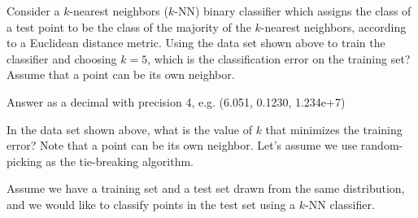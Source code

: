 \documentclass[11pt,addpoints,answers]{exam}
\numberwithin{equation}{section} %
\numberwithin{figure}{section} %
\numberwithin{table}{section} %
\begin{document}
\begin{questions}
    \question[3] Consider a $k$-nearest neighbors ($k$-NN) binary classifier which assigns the class of a test point to be the class of the majority of the $k$-nearest neighbors, according to a Euclidean distance metric. Using the data set shown above to train the classifier and choosing $k=5$, which is the classification error on the training set? Assume that a point can be its own neighbor.
    
    Answer as a decimal with precision 4, e.g. (6.051, 0.1230, 1.234e+7)
    
    \begin{tcolorbox}[fit,height=1cm, width=4cm, blank, borderline={1pt}{-2pt},nobeforeafter, top=2pt, left=2pt, right=2pt, bottom=2pt]
    \end{tcolorbox}
 
    
    
    \question[3] In the data set shown above, what is the value of $k$ that minimizes the training error? Note that a point can be its own neighbor. Let’s assume we use random-picking as the tie-breaking algorithm.
    
    \begin{tcolorbox}[fit,height=1cm, width=4cm, blank, borderline={1pt}{-2pt},nobeforeafter, top=2pt, left=2pt, right=2pt, bottom=2pt]
    \end{tcolorbox}

    
    
    \question[3] Assume we have a training set and a test set drawn from the same distribution, and we would like to classify points in the test set using a $k$-NN classifier. 
    
\end{questions}
\end{document}
